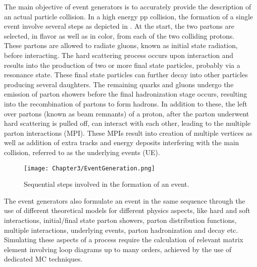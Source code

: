 The main objective of event generators is to accurately provide the description of an actual particle collision.
In a high energy pp collision, the formation of a single event involve several steps as depicted in \fig{\ref{fig:EvtGen}}. At the start, the two partons
are selected, in flavor as well as in color, from each of the two colliding protons. These partons are allowed to radiate gluons, known as initial state radiation,
before interacting. The hard scattering process occurs upon interaction and results into the production of two or more final state particles, probably via a
resonance state. These final state particles can further decay into other particles producing
several daughters. The remaining quarks and gluons undergo the emission of parton showers before the final hadronization stage occurs, resulting into the
recombination of partons to form hadrons. In addition to these, the left over partons (known as beam remnants) of a proton,
after the parton underwent hard scattering is pulled off, can interact with each other, leading to the multiple parton interactions (MPI).
These MPIs result into creation of multiple vertices as well as addition of extra tracks and energy deposits interfering with the main collision,
referred to as the underlying events (UE). 
\begin{figure}[h]
\begin{center}
\texttt{[image: Chapter3/EventGeneration.png]}
\caption{Sequential steps involved in the formation of an event.}
\label{fig:EvtGen}
\end{center}
\end{figure}

The event generators also formulate an event in the same sequence through the use of different theoretical models for different physics aspects, like
hard and soft interactions, initial$/$final state parton showers, parton distribution functions, multiple interactions, underlying events,
parton hadronization and decay etc. Simulating these aspects of a process require the calculation of relevant matrix element involving loop
diagrams up to many orders, achieved by the use of dedicated MC techniques.

